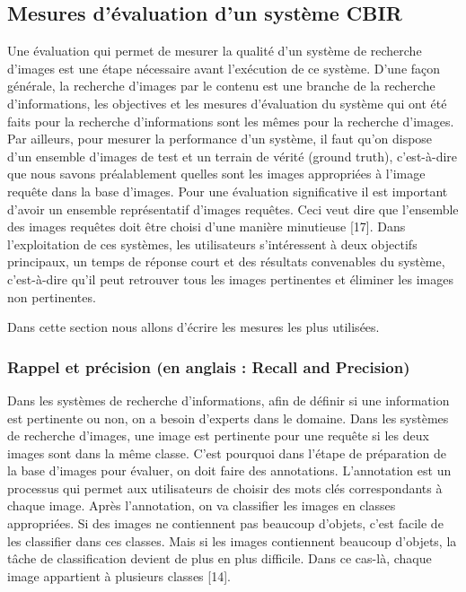 \subsection{Mesures d’évaluation d’un système CBIR}
Une évaluation qui permet de mesurer la qualité d’un système de
recherche d’images est une étape nécessaire avant l’exécution de ce système. D’une façon générale, la recherche d’images par le contenu est une branche de la recherche d’informations, les objectives et les mesures d’évaluation du système qui ont été faits pour la recherche d’informations sont les mêmes
pour la recherche d’images. Par ailleurs, pour mesurer la performance d’un système, il faut qu'on dispose d'un ensemble d’images de test et un terrain de vérité (ground truth),
c'est-à-dire que nous savons préalablement quelles sont les images
appropriées à l'image requête dans la base d'images. Pour une évaluation significative il est important d'avoir un ensemble représentatif d'images requêtes. Ceci veut dire que l'ensemble des images requêtes doit être choisi d’une manière minutieuse [17].
Dans l’exploitation de ces systèmes, les utilisateurs s’intéressent à deux objectifs principaux, un temps de réponse court et des résultats convenables du système, c'est-à-dire qu’il peut retrouver tous les images pertinentes et éliminer les images non pertinentes.


Dans cette section nous allons d’écrire les mesures les plus utilisées.

\subsubsection{Rappel et précision (en anglais : Recall and Precision)}

Dans les systèmes de recherche d’informations, afin de définir si une
information est pertinente ou non, on a besoin d’experts dans le domaine.
Dans les systèmes de recherche d’images, une image est pertinente pour une
requête si les deux images sont dans la même classe. C’est pourquoi dans
l’étape de préparation de la base d’images pour évaluer, on doit faire des
annotations. L’annotation est un processus qui permet aux utilisateurs de
choisir des mots clés correspondants à chaque image. Après l’annotation, on
va classifier les images en classes appropriées. Si des images ne contiennent pas beaucoup d’objets, c’est facile de les classifier dans ces classes. Mais si
les images contiennent beaucoup d’objets, la tâche de classification devient
de plus en plus difficile. Dans ce cas-là, chaque image appartient à plusieurs
classes [14].

